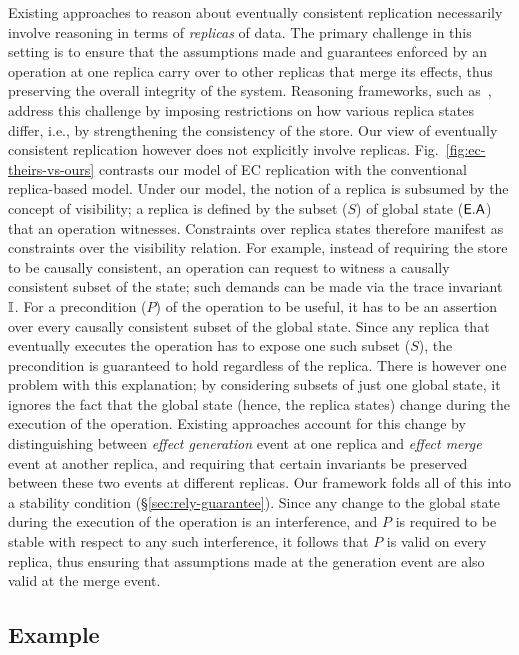 Existing approaches to reason about eventually consistent replication
necessarily involve reasoning in terms of \emph{replicas} of data. The
primary challenge in this setting is to ensure that the assumptions
made and guarantees enforced by an operation at one replica carry over
to other replicas that merge its effects, thus preserving the overall
integrity of the system. Reasoning frameworks, such
as~\cite{gotsmanpopl16}, address this challenge by imposing
restrictions on how various replica states differ, i.e., by
strengthening the consistency of the store. Our view of eventually
consistent replication however does not explicitly involve replicas.
Fig.~\ref{fig:ec-theirs-vs-ours} contrasts our model of EC replication
with the conventional replica-based model.  Under our model, the
notion of a replica is subsumed by the concept of visibility; a
replica is defined by the subset ($S$) of global state ($\textsf{E}.\textsf{A}$) that
an operation witnesses.  Constraints over replica states therefore
manifest as constraints over the visibility relation. For example,
instead of requiring the store to be causally consistent, an operation
can request to witness a causally consistent subset of the state; such
demands can be made via the trace invariant $\mathbb{I}$. For a precondition
($P$) of the operation to be useful, it has to be an assertion over
every causally consistent subset of the global state. Since any
replica that eventually executes the operation has to expose one such
subset ($S$), the precondition is guaranteed to hold regardless of the
replica. There is however one problem with this explanation; by
considering subsets of just one global state, it ignores the fact that
the global state (hence, the replica states) change during the
execution of the operation. Existing approaches account for this
change by distinguishing between \emph{effect generation} event at one
replica and \emph{effect merge} event at another replica, and
requiring that certain invariants be preserved between these two
events at different replicas. Our framework folds all of this into a
stability condition (\S\ref{sec:rely-guarantee}). Since any change to
the global state during the execution of the operation is an
interference, and $P$ is required to be stable with respect to any
such interference, it follows that $P$ is valid on every replica, thus
ensuring that assumptions made at the generation event are also valid
at the merge event.

\subsection{Example}

